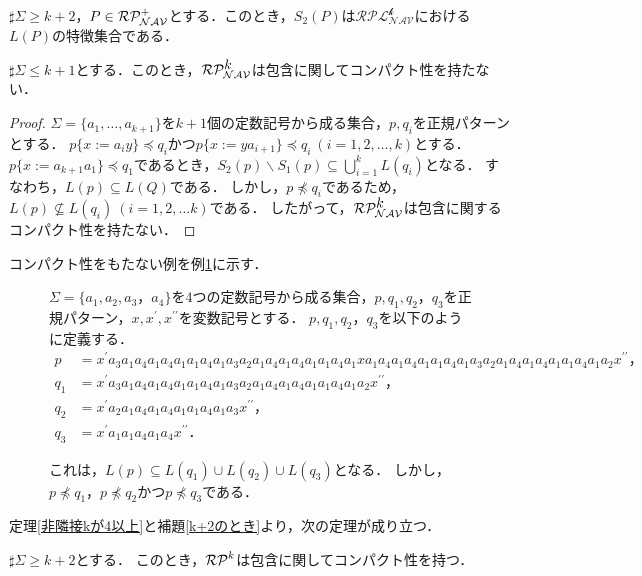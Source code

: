 \begin{col}
$\sharp\Sigma \ge k+2$，$P \in \mathcal{RP^{+}_{NAV}}$とする．このとき，$S_{2}(P)$は$\mathcal{RPL^{\mbox{$k$}}_{NAV}}$における$L(P)$の特徴集合である．
\end{col}

\begin{lem}\label{k+2のとき}
$\sharp\Sigma \le k+1$とする．このとき，$\mathcal{RP^{\mbox{$k$}}_{NAV}}$は包含に関してコンパクト性を持たない．
\end{lem}
\begin{proof}
$\Sigma = \{ a_{1}, \ldots , a_{k+1} \}$を$k+1$個の定数記号から成る集合，$p, q_{i}$を正規パターンとする．
$p \{ x := a_{i}y \} \preceq q_{i}$かつ$p \{ x := ya_{i+1} \} \preceq q_{i}~(i=1,2, \ldots ,k)$とする．
$p \{ x:= a_{k+1}a_{1} \} \preceq q_{1}$であるとき，$S_{2}(p) \backslash S_{1}(p) \subseteq \bigcup^{k}_{i=1} L(q_{i})$となる． 
すなわち，$L(p) \subseteq L(Q)$である．
しかし，$p \not \preceq q_{i}$であるため，$L(p) \not \subseteq L(q_{i})~(i=1,2, \ldots k)$である．
したがって，$\mathcal{RP^{\mbox{$k$}}_{NAV}}$は包含に関するコンパクト性を持たない．
\end{proof}

コンパクト性をもたない例を例\ref{反例k+1}に示す．
\begin{figure*}[tb]
\begin{ex}\label{反例k+1}
$\Sigma= \{a_{1}, a_{2}, a_{3}，a_{4} \}$を$4$つの定数記号から成る集合，$p,q_{1},q_{2}，q_{3}$を正規パターン，$x,x^{\prime},x^{\prime\prime}$を変数記号とする．
$p,q_{1},q_{2}，q_{3}$を以下のように定義する．
\begin{align*}
p & = x^{\prime}a_{3}a_{1}a_{4}a_{1}a_{4}a_{1}a_{1}a_{4}a_{1}a_{3}a_{2}a_{1}a_{4}a_{1}a_{4}a_{1}a_{1}a_{4}a_{1}xa_{1}a_{4}a_{1}a_{4}a_{1}a_{1}a_{4}a_{1}a_{3}a_{2}a_{1}a_{4}a_{1}a_{4}a_{1}a_{1}a_{4}a_{1}a_{2}x^{\prime\prime}，\\
q_{1} & = x^{\prime}a_{3}a_{1}a_{4}a_{1}a_{4}a_{1}a_{1}a_{4}a_{1}a_{3}a_{2}a_{1}a_{4}a_{1}a_{4}a_{1}a_{1}a_{4}a_{1}a_{2}x^{\prime\prime}，\\
q_{2} & = x^{\prime}a_{2}a_{1}a_{4}a_{1}a_{4}a_{1}a_{1}a_{4}a_{1}a_{3}x^{\prime\prime}，\\
q_{3} & = x^{\prime}a_{1}a_{1}a_{4}a_{1}a_{4}x^{\prime\prime}．
\end{align*}

これは，$L(p) \subseteq L(q_{1}) \cup L(q_{2}) \cup L(q_{3})$となる．
しかし，$p \not \preceq q_{1}，p \not \preceq q_{2}$かつ$p \not \preceq q_{3}$である．
\end{ex}
\end{figure*}

定理\ref{非隣接kが4以上}と補題\ref{k+2のとき}より，次の定理が成り立つ．

\begin{thm}
$\sharp\Sigma \ge k+2$とする．
このとき，$\mathcal{RP}^{k}$は包含に関してコンパクト性を持つ．
\end{thm}